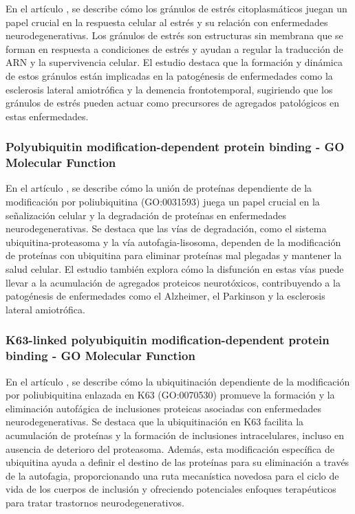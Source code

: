 En el artículo \cite{PMID:34248597}, se describe cómo los gránulos de estrés citoplasmáticos juegan un papel crucial en la respuesta celular al estrés y su relación con enfermedades neurodegenerativas. Los gránulos de estrés son estructuras sin membrana que se forman en respuesta a condiciones de estrés y ayudan a regular la traducción de ARN y la supervivencia celular. El estudio destaca que la formación y dinámica de estos gránulos están implicadas en la patogénesis de enfermedades como la esclerosis lateral amiotrófica y la demencia frontotemporal, sugiriendo que los gránulos de estrés pueden actuar como precursores de agregados patológicos en estas enfermedades.

\subsubsection{Polyubiquitin modification-dependent protein binding - GO Molecular Function}

En el artículo \cite{Schmidt2021}, se describe cómo la unión de proteínas dependiente de la modificación por poliubiquitina (GO:0031593) juega un papel crucial en la señalización celular y la degradación de proteínas en enfermedades neurodegenerativas. Se destaca que las vías de degradación, como el sistema ubiquitina-proteasoma y la vía autofagia-lisosoma, dependen de la modificación de proteínas con ubiquitina para eliminar proteínas mal plegadas y mantener la salud celular. El estudio también explora cómo la disfunción en estas vías puede llevar a la acumulación de agregados proteicos neurotóxicos, contribuyendo a la patogénesis de enfermedades como el Alzheimer, el Parkinson y la esclerosis lateral amiotrófica.

\subsubsection{K63-linked polyubiquitin modification-dependent protein binding - GO Molecular Function}
En el artículo \cite{10.1093/hmg/ddm320}, se describe cómo la ubiquitinación dependiente de la modificación por poliubiquitina enlazada en K63 (GO:0070530) promueve la formación y la eliminación autofágica de inclusiones proteicas asociadas con enfermedades neurodegenerativas. Se destaca que la ubiquitinación en K63 facilita la acumulación de proteínas y la formación de inclusiones intracelulares, incluso en ausencia de deterioro del proteasoma. Además, esta modificación específica de ubiquitina ayuda a definir el destino de las proteínas para su eliminación a través de la autofagia, proporcionando una ruta mecanística novedosa para el ciclo de vida de los cuerpos de inclusión y ofreciendo potenciales enfoques terapéuticos para tratar trastornos neurodegenerativos.

